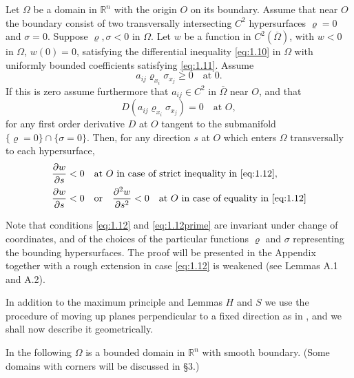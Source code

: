 \begin{lemma}
  Let $\Omega$ be a domain in $\mathbb{R}^n$ with the origin $O$ on its boundary.
  Assume that near $O$ the boundary consist of two transversally intersecting
  $C^2$ hypersurfaces $\varrho = 0$ and $\sigma = 0$.
  Suppose $\varrho,\sigma<0$ in $\Omega$. Let $w$ be a function in $C^2(\overline{\Omega})$,
  with $w<0$ in $\Omega$, $w(0)=0$, satisfying the differential inequality \eqref{eq:1.10}
  in $\Omega$ with uniformly bounded coefficients satisfying \eqref{eq:1.11}. Assume
  \begin{equation}\label{eq:1.12}
    a_{ij}\varrho_{x_i}\sigma_{x_j} \geq 0\quad \text{at } 0.
  \end{equation}
  If this is zero assume furthermore that $a_{ij}\in C^2$ in $\overline{\Omega}$
  near $O$, and that
  \begin{equation}\label{eq:1.12prime}
    D(a_{ij}\varrho_{x_i}\sigma_{x_j}) = 0 \quad \text{at } O, \tag{$1.12'$}
  \end{equation}
  for any first order derivative $D$ at $O$ tangent to the submanifold
  $\{\varrho=0\}\cap \{\sigma=0\}$.
  Then, for any direction $s$ at $O$ which enters $\Omega$ transversally to each hypersurface,
  \begin{equation}\label{eq:1.13}
    \begin{aligned}
      & \frac{\partial w}{\partial s} < 0 \quad\text{at } O 
        \text{ in case of strict inequality in \eqref{eq:1.12}}, \\
      & \frac{\partial w}{\partial s} < 0\quad \text{or} \quad
        \frac{\partial^2w}{\partial s^2} < 0\quad
        \text{at } O \text{ in case of equality in \eqref{eq:1.12}}
    \end{aligned}
  \end{equation}
\end{lemma}

Note that conditions \eqref{eq:1.12} and \eqref{eq:1.12prime} are invariant under
change of coordinates, and of the choices of the particular functions $\varrho$ 
and $\sigma$ representing the bounding hypersurfaces.
The proof will be presented in the Appendix together with a rough extension
in case \eqref{eq:1.12} is weakened (see Lemmas A.1 and A.2).

In addition to the maximum principle and Lemmas $H$ and $S$
we use the procedure of moving up planes perpendicular to a fixed direction as in \cite{serrin_symmetry_1971},
and we shall now describe it geometrically.

In the following $\Omega$ is a bounded domain in $\mathbb{R}^n$ with smooth boundary.
(Some domains with corners will be discussed in \S 3.)

